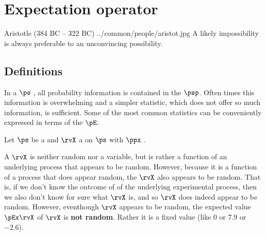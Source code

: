 \chapter{Expectation operator}
\label{chp:stats}
\qboxnps
  {Aristotle (384 BC -- 322 BC)
    \footnotemark
  }
  {../common/people/aristot.jpg}
  {A likely impossibility is always preferable to an
  unconvincing possibility.}
\section{Definitions}
\label{sec:pE_defs}
In a  $\ps$ , all probability information
is contained in the  $\psp$.
Often times this information is overwhelming and a simpler statistic,
which does not offer so much information, is sufficient.
Some of the most common statistics can be conveniently expressed in terms
of the  $\pE$.
\begin{definition}
\label{def:pE}
Let $\ps$ be a   and
$\rvX$ a   on $\ps$ with
 $\ppx$ .
\end{definition}

A  $\rvX$ is neither random nor a variable,
but is rather a function of an underlying process that appears to be random.
However, because it is a function of a process that does appear random,
the  $\rvX$ also appears to be random.
That is, if we don't know the outcome of of the underlying experimental
process, then we also don't know for sure what $\rvX$ is, and so $\rvX$ does
indeed appear to be random.
However, eventhough $\rvX$ appears to be random,
the expected value $\pEx\rvX$  of $\rvX$ is {\bf not random}.
Rather it is a fixed value (like $0$ or $7.9$ or $-2.6$).

